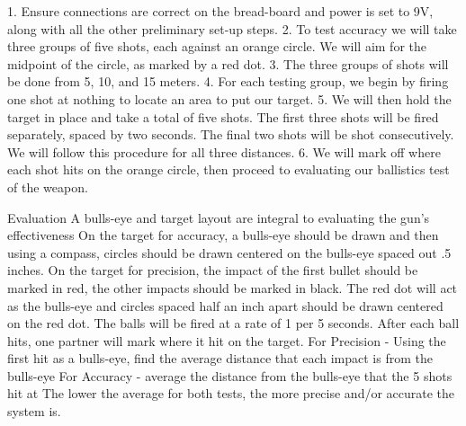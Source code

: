 \documentclass{article}
\begin{document}




\appendix

\label{app:A}
1. Ensure connections are correct on the bread-board and power is set to 9V, along with all the other preliminary set-up steps.
2. To test accuracy we will take three groups of five shots, each against an orange circle. We will aim for the midpoint of the circle, as marked by a red dot.
3. The three groups of shots will be done from 5, 10, and 15 meters.
4. For each testing group, we begin by firing one shot at nothing to locate an area to put our target.
5. We will then hold the target in place and take a total of five shots. The first three shots will be fired separately, spaced by two seconds. The final two shots will be shot consecutively. We will follow this procedure for all three distances. 
6. We will mark off where each shot hits on the orange circle, then proceed to evaluating our ballistics test of the weapon.
 
Evaluation
A bulls-eye and target layout are integral to evaluating the gun’s effectiveness
On the target for accuracy, a bulls-eye should be drawn and then using a compass, circles should be drawn centered on the bulls-eye spaced out .5 inches.
On the target for precision, the impact of the first bullet should be marked in red, the other impacts should be marked in black. The red dot will act as the bulls-eye and circles spaced half an inch apart should be drawn centered on the red dot.
The balls will be fired at a rate of 1 per 5 seconds. After each ball hits, one partner will mark where it hit on the target. 
For Precision - Using the first hit as a bulls-eye, find the average distance that each impact is from the bulls-eye
For Accuracy - average the distance from the bulls-eye that the 5 shots hit at
The lower the average for both tests, the more precise and/or accurate the system is.
\end{document}
